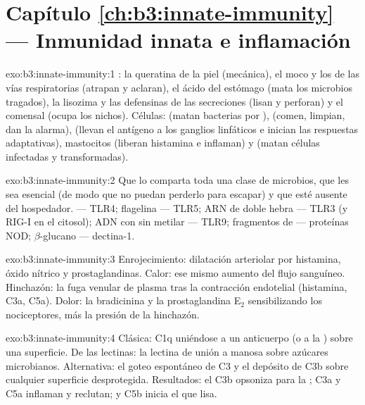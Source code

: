 \section*{Capítulo \ref{ch:b3:innate-immunity} --- Inmunidad innata e inflamación}

\begin{solution}{exo:b3:innate-immunity:1}
: la queratina de la piel (mecánica), el moco y los  de las
vías respiratorias (atrapan y aclaran), el ácido del estómago (mata los
microbios tragados), la lisozima y las defensinas de las secreciones
(lisan y perforan) y el  comensal (ocupa los nichos). Células:
 (matan bacterias por ),  (comen,
limpian, dan la alarma),  (llevan el antígeno a los
ganglios linfáticos e inician las respuestas adaptativas), mastocitos
(liberan histamina e inflaman) y  (matan
células infectadas y transformadas).
\end{solution}

\begin{solution}{exo:b3:innate-immunity:2}
Que lo comparta toda una clase de microbios, que les sea esencial (de
modo que no puedan perderlo para escapar) y que esté ausente del
hospedador.  --- TLR4; flagelina --- TLR5; ARN de doble
hebra --- TLR3 (y RIG-I en el citosol); ADN con  sin metilar --- TLR9;
fragmentos de  --- proteínas NOD; $\beta$-glucano ---
dectina-1.
\end{solution}

\begin{solution}{exo:b3:innate-immunity:3}
Enrojecimiento: dilatación arteriolar por histamina, óxido nítrico y
prostaglandinas. Calor: ese mismo aumento del flujo sanguíneo. Hinchazón:
la fuga venular de plasma tras la contracción endotelial (histamina, C3a,
C5a). Dolor: la bradicinina y la prostaglandina E$_{2}$ sensibilizando
los nociceptores, más la presión de la hinchazón.
\end{solution}

\begin{solution}{exo:b3:innate-immunity:4}
Clásica: C1q uniéndose a un anticuerpo (o a la ) sobre
una superficie. De las lectinas: la lectina de unión a manosa sobre
azúcares microbianos. Alternativa: el goteo espontáneo de C3 y el
depósito de C3b sobre cualquier superficie desprotegida. Resultados: el
C3b opsoniza para la ; C3a y C5a inflaman y reclutan; y C5b
inicia el  que lisa.
\end{solution}

